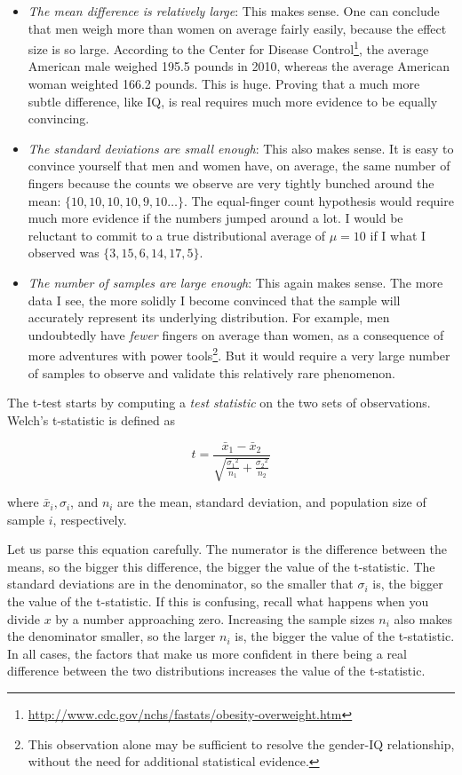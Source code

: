 \documentclass[10pt]{article}
\begin{document}
\begin{itemize}
  \item \textit{The mean difference is relatively large}: This makes sense. One can conclude that men weigh more than women on average fairly easily, because the effect size is so large. According to the Center for Disease Control\footnote{\url{http://www.cdc.gov/nchs/fastats/obesity-overweight.htm}}, the average American male weighed 195.5 pounds in 2010, whereas the average American woman weighted 166.2 pounds. This is huge. Proving that a much more subtle difference, like IQ, is real requires much more evidence to be equally convincing.
  \item \textit{The standard deviations are small enough}: This also makes sense. It is easy to convince yourself that men and women have, on average, the same number of fingers because the counts we observe are very tightly bunched around the mean: $\{10,10,10,10,9,10\ldots\}$. The equal-finger count hypothesis would require much more evidence if the numbers jumped around a lot. I would be reluctant to commit to a true distributional average of $\mu=10$ if I what I observed was $\{3,15,6,14,17,5\}$.
  \item \textit{The number of samples are large enough}: This again makes sense. The more data I see, the more solidly I become convinced that the sample will accurately represent its underlying distribution. For example, men undoubtedly have \textit{fewer} fingers on average than women, as a consequence of more adventures with power tools\footnote{This observation alone may be sufficient to resolve the gender-IQ relationship, without the need for additional statistical evidence.}. But it would require a very large number of samples to observe and validate this relatively rare phenomenon.
\end{itemize}

The t-test starts by computing a \textit{test statistic} on the two sets of observations. Welch's t-statistic is defined as

\[
t=\frac{\bar{x}_{1}-\bar{x}_{2}}{\sqrt{\frac{\sigma_{1}{ }^{2}}{n_{1}}+\frac{\sigma_{2}{ }^{2}}{n_{2}}}}
\]

where $\bar{x}_{i}, \sigma_{i}$, and $n_{i}$ are the mean, standard deviation, and population size of sample $i$, respectively.

Let us parse this equation carefully. The numerator is the difference between the means, so the bigger this difference, the bigger the value of the t-statistic. The standard deviations are in the denominator, so the smaller that $\sigma_{i}$ is, the bigger the value of the t-statistic. If this is confusing, recall what happens when you divide $x$ by a number approaching zero. Increasing the sample sizes $n_{i}$ also makes the denominator smaller, so the larger $n_{i}$ is, the bigger the value of the t-statistic. In all cases, the factors that make us more confident in there being a real difference between the two distributions increases the value of the t-statistic.
\end{document}
